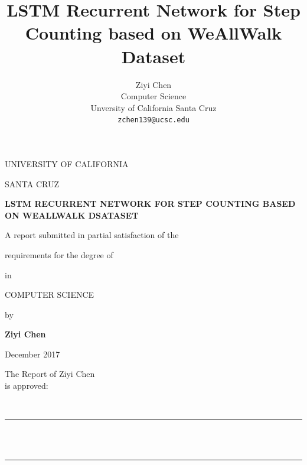 \documentclass[11pt]{article}
\title{LSTM Recurrent Network for Step Counting based on WeAllWalk Dataset}
\author{Ziyi Chen \\
  Computer Science  \\
  Unversity of California Santa Cruz\\
  {\tt zchen139@ucsc.edu}}
\date{}
\begin{document}
\onecolumn

{
    {\setcounter{page}{0}}
  
  \enlargethispage{\footskip}

  \begin{center}
  \Large
    UNIVERSITY OF CALIFORNIA \par
    \smallskip
    {\expandafter\uppercase\expandafter{SANTA CRUZ}} \par
    \bigskip
    {\bfseries {\expandafter\uppercase\expandafter{LSTM Recurrent Network for Step Counting based on WeAllWalk Dsataset}} \par}
    \medskip
    A report submitted in partial satisfaction of the \par
    requirements for the degree of \par
    \bigskip
    {\expandafter{}} \par
    \bigskip
    in \par
    \bigskip
    {\expandafter\uppercase\expandafter{COMPUTER SCIENCE}} \par
    \bigskip
    by \par
    \bigskip
    {\bfseries Ziyi Chen} \par
    \bigskip
    December 2017 \par
  \end{center}

\vfill
\begin{center}
\Large
\hfill \parbox{3in}{The Report of {Ziyi Chen}\\ is approved:} \\
\bigskip \bigskip \medskip
\hfill\rule{2.6in}{0.5pt}\\
\hfill{}\\
\bigskip \medskip
\hfill\rule{2.6in}{0.5pt}\\
\hfill{}\\
\bigskip \smallskip
\end{center}



\maketitle
\begin{abstract}


\end{abstract}}
\end{document}
